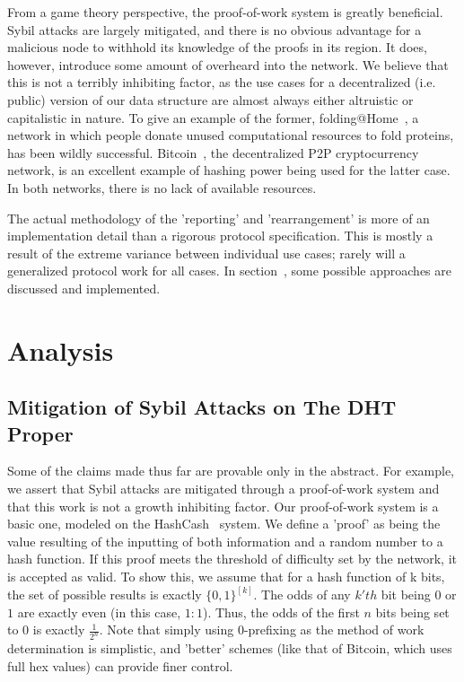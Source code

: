 \documentclass[10pt]{IEEEtran}
\begin{document}
\par From a game theory perspective, the proof-of-work system is greatly beneficial. Sybil attacks are largely mitigated, and there is no obvious advantage for a malicious node to withhold its knowledge of the proofs in its region. It does, however, introduce some amount of overheard into the network. We believe that this is not a terribly inhibiting factor, as the use cases for a decentralized (i.e. public) version of our data structure are almost always either altruistic or capitalistic in nature. To give an example of the former, folding@Home~\cite{Anderson:2002vr}, a network in which people donate unused computational resources to fold proteins, has been wildly successful. Bitcoin~\cite{Nakamoto:2008ti}, the decentralized P2P cryptocurrency network, is an excellent example of hashing power being used for the latter case. In both networks, there is no lack of available resources.

\par The actual methodology of the 'reporting' and 'rearrangement' is more of an implementation detail than a rigorous protocol specification. This is mostly a result of the extreme variance between individual use cases; rarely will a generalized protocol work for all cases. In section~, some possible approaches are discussed and implemented. 

\section{Analysis}
\subsection{Mitigation of Sybil Attacks on The DHT Proper}
\par Some of the claims made thus far are provable only in the abstract. For example, we assert that Sybil attacks are mitigated through a proof-of-work system and that this work is not a growth inhibiting factor. Our proof-of-work system is a basic one, modeled on the HashCash~\cite{Back:2002vq} system. We define a 'proof' as being the value resulting of the inputting of both information and a random number to a hash function. If this proof meets the threshold of difficulty set by the network, it is accepted as valid. To show this, we assume that for a hash function of k bits, the set of possible results is exactly $\{0,1\}^{[k]}$. The odds of any $k'th$ bit being $0$ or $1$ are exactly even (in this case, $1:1$). Thus, the odds of the first $n$ bits being set to 0 is exactly $\frac{1}{2^n}$. Note that simply using $0$-prefixing as the method of work determination is simplistic, and 'better' schemes (like that of Bitcoin, which uses full hex values) can provide finer control. 
\end{document}

